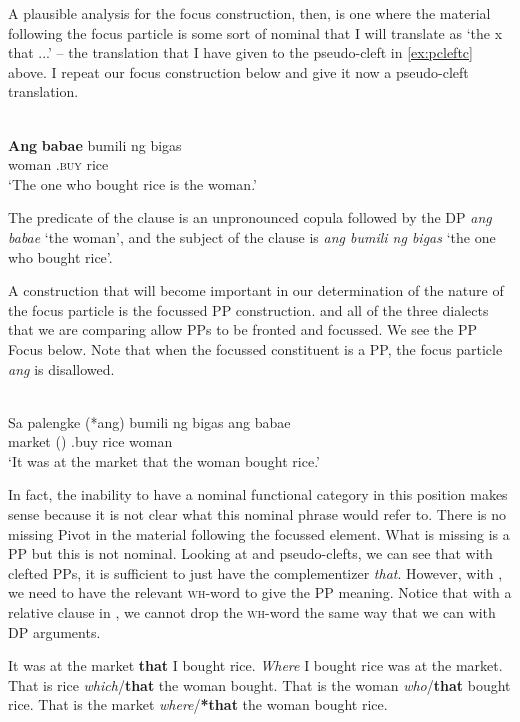 \documentclass[output=paper]{langsci/langscibook}
\begin{document}
A plausible analysis for the focus construction, then, is one where the
material following the focus particle is some sort of nominal that I will
translate as `the x that ...' -- the translation that I have given to the
pseudo-cleft in \eqref{ex:pcleftc} above.  I repeat our  focus
construction below and give it now a pseudo-cleft translation.

\ea {}\\
    \gll  \textbf{Ang} \textbf{babae}  bumili ng bigas\\
    \Nom{} woman \Nom{} \At.\textsc{buy} \Acc{} rice\\
    \glt `The one who bought rice is the woman.'
\z

The predicate of the clause is an unpronounced copula followed by the DP
\emph{ang babae} `the woman', and the subject of the clause is \emph{ang bumili
ng bigas} `the one who bought rice'.

A construction that will become important in our determination of the nature of
the focus particle is the focussed PP construction.   and all of the
three  dialects that we are comparing allow PPs to be fronted and
focussed.  We see the  PP Focus below.  Note that when the focussed
constituent is a PP, the focus particle \emph{ang} is disallowed.

\ea {}\\
    \gll Sa palengke (*ang) bumili ng bigas ang babae\\
    \Prep{} market (\Nom{}) \At.buy  \Acc{} rice \Nom{} woman\\
    \glt `It was at the market that the woman bought rice.'
\z

In fact, the inability to have a nominal functional category in this position
makes sense because it is not clear what this nominal phrase would refer to.
There is no missing Pivot in the material following the focussed element.  What
is missing is a PP but this is not nominal.  Looking at   and
pseudo-clefts, we can see that with clefted PPs, it is sufficient to just have
the complementizer \emph{that}.  However, with , we need to have
the relevant \textsc{wh}-word to give the PP meaning.  Notice that with a
relative clause in , we cannot drop the \textsc{wh}-word the same way
that we can with DP arguments.

\ea
    \ea It was at the market \textbf{that} I bought rice.
    \ex  \emph{Where} I bought rice was at the market.
    \ex  That is rice \emph{which}/\textbf{that} the woman bought.
    \ex  That is the woman \emph{who}/\textbf{that} bought rice.
    \ex That is the market \emph{where}/\textbf{*that} the woman bought rice.
    \z
\z
\end{document}

